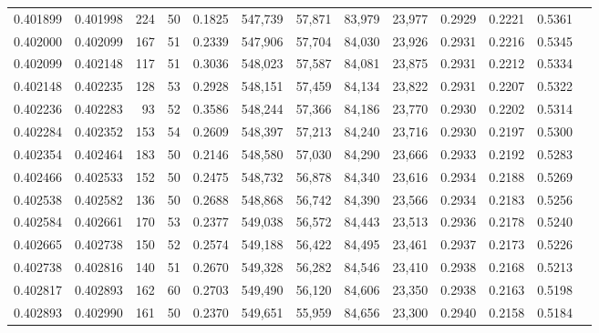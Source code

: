 \begin{tabular}{rrrrrrrrrrrrr}
0.401899 & 0.401998 &   224 &  50 &                                     0.1825 & 547,739 &  57,871 &  83,979 &  23,977 & 0.2929 & 0.2221 & 0.5361 \\
0.402000 & 0.402099 &   167 &  51 &                                     0.2339 & 547,906 &  57,704 &  84,030 &  23,926 & 0.2931 & 0.2216 & 0.5345 \\
0.402099 & 0.402148 &   117 &  51 &                                     0.3036 & 548,023 &  57,587 &  84,081 &  23,875 & 0.2931 & 0.2212 & 0.5334 \\
0.402148 & 0.402235 &   128 &  53 &                                     0.2928 & 548,151 &  57,459 &  84,134 &  23,822 & 0.2931 & 0.2207 & 0.5322 \\
0.402236 & 0.402283 &    93 &  52 &                                     0.3586 & 548,244 &  57,366 &  84,186 &  23,770 & 0.2930 & 0.2202 & 0.5314 \\
0.402284 & 0.402352 &   153 &  54 &                                     0.2609 & 548,397 &  57,213 &  84,240 &  23,716 & 0.2930 & 0.2197 & 0.5300 \\
0.402354 & 0.402464 &   183 &  50 &                                     0.2146 & 548,580 &  57,030 &  84,290 &  23,666 & 0.2933 & 0.2192 & 0.5283 \\
0.402466 & 0.402533 &   152 &  50 &                                     0.2475 & 548,732 &  56,878 &  84,340 &  23,616 & 0.2934 & 0.2188 & 0.5269 \\
0.402538 & 0.402582 &   136 &  50 &                                     0.2688 & 548,868 &  56,742 &  84,390 &  23,566 & 0.2934 & 0.2183 & 0.5256 \\
0.402584 & 0.402661 &   170 &  53 &                                     0.2377 & 549,038 &  56,572 &  84,443 &  23,513 & 0.2936 & 0.2178 & 0.5240 \\
0.402665 & 0.402738 &   150 &  52 &                                     0.2574 & 549,188 &  56,422 &  84,495 &  23,461 & 0.2937 & 0.2173 & 0.5226 \\
0.402738 & 0.402816 &   140 &  51 &                                     0.2670 & 549,328 &  56,282 &  84,546 &  23,410 & 0.2938 & 0.2168 & 0.5213 \\
0.402817 & 0.402893 &   162 &  60 &                                     0.2703 & 549,490 &  56,120 &  84,606 &  23,350 & 0.2938 & 0.2163 & 0.5198 \\
0.402893 & 0.402990 &   161 &  50 &                                     0.2370 & 549,651 &  55,959 &  84,656 &  23,300 & 0.2940 & 0.2158 & 0.5184 \\

\end{tabular}
